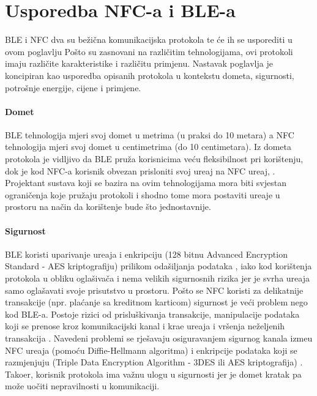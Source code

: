 


\chapter{Usporedba NFC-a i BLE-a}


BLE i NFC dva su be\v{z}i\v{c}na komunikacijska protokola te \'{c}e ih se usporediti u ovom poglavlju Po\v{s}to su zasnovani na razli\v{c}itim tehnologijama, ovi protokoli imaju razli\v{c}ite karakteristike i razli\v{c}itu primjenu. 
Nastavak poglavlja je koncipiran kao usporedba opisanih protokola u kontekstu dometa, sigurnosti, potro\v{s}nje energije, cijene i primjene. 

\subsubsection{Domet}

BLE tehnologija mjeri svoj domet u metrima (u praksi do 10 metara) a NFC tehnologija mjeri svoj domet u centimetrima (do 10 centimetara). Iz dometa protokola je vidljivo da BLE pru\v{z}a korisnicima ve\'{c}u fleksibilnost pri kori\v{s}tenju, dok je kod NFC-a korisnik obvezan prisloniti svoj ure\dj aj na NFC ure\dj aj, . Projektant sustava koji se bazira na ovim tehnologijama mora biti svjestan ograni\v{c}enja koje pru\v{z}aju protokoli i shodno tome mora postaviti ure\dj aje u prostoru na na\v{c}in da kori\v{s}tenje bude \v{s}to jednostavnije.

\subsubsection{Sigurnost}

BLE koristi uparivanje ure\dj aja i enkripciju (128 bitnu Advanced Encryption Standard - AES kriptografiju) prilikom oda\v{s}iljanja podataka  \cite{bleSecurity}, iako kod kori\v{s}tenja protokola u obliku ogla\v{s}iva\v{c}a i nema velikih sigurnosnih rizika jer je svrha ure\dj aja samo ogla\v{s}avati svoje prisutstvo u prostoru. Po\v{s}to se NFC koristi za delikatnije transakcije (npr. pla\'{c}anje sa kreditnom karticom) sigurnost je ve\'{c}i problem nego kod BLE-a. Postoje rizici od prislu\v{s}kivanja transakcije, manipulacije podataka koji se prenose kroz komunikacijski kanal i kra\dj e ure\dj aja i vr\v{s}enja ne\v{z}eljenih transakcija \cite{nfcSecurity}. Navedeni problemi se rje\v{s}avaju osiguravanjem sigurnog kanala izme\dj u NFC ure\dj aja (pomo\'{c}u Diffie-Hellmann algoritma) i enkripcije podataka koji se razmjenjuju (Triple Data Encryption Algorithm - 3DES ili AES kriptografija) \cite{nfcSecurityTwo}. Tako\dj er, korisnik protokola ima va\v{z}nu ulogu u sigurnosti jer je domet kratak pa mo\v{z}e uo\v{c}iti nepravilnosti u komunikaciji.

